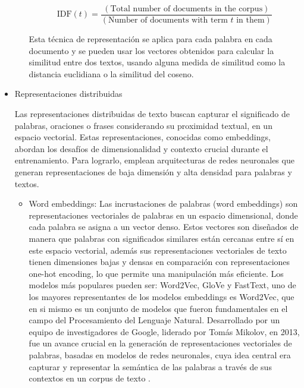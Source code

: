 \begin{itemize}
\begin{itemize}
\begin{equation} \label{eq:e24}
	\textrm{IDF}(t)=\frac{(\textrm{Total number of documents in the corpus})}{(\textrm{Number of documents with term } t \textrm{ in them})}
\end{equation}

Esta técnica de representación se aplica para cada palabra en cada documento y se  pueden usar los vectores obtenidos para calcular la similitud entre dos textos, usando alguna medida de similitud como la distancia euclidiana o la similitud del coseno.


\end{itemize}

\item Representaciones distribuidas

Las representaciones distribuidas de texto buscan capturar el significado de palabras, oraciones o frases considerando su proximidad textual, en un espacio vectorial. Estas representaciones, conocidas como embeddings, abordan los desafíos de dimensionalidad y contexto crucial durante el entrenamiento. Para lograrlo, emplean arquitecturas de redes neuronales que generan representaciones de baja dimensión y alta densidad para palabras y textos.

\begin{itemize}

	\item Word embeddings: Las incrustaciones de palabras (word embeddings) son representaciones vectoriales de palabras en un espacio dimensional, donde cada palabra se asigna a un vector denso. Estos vectores son diseñados de manera que palabras con significados similares están cercanas entre sí en este espacio vectorial, además sus representaciones vectoriales de texto tienen dimensiones bajas y densas en comparación con representaciones one-hot encoding, lo que permite una manipulación más eficiente. Los modelos  más populares pueden ser: Word2Vec, GloVe y FastText, uno de los mayores representantes de los modelos embeddings es Word2Vec, que en si mismo es un conjunto de modelos que fueron fundamentales en el campo del Procesamiento del Lenguaje Natural. Desarrollado por un equipo de investigadores de Google, liderado por Tomás Mikolov, en 2013, fue un avance crucial en la generación de representaciones vectoriales de palabras, basadas en modelos de redes neuronales, cuya idea central era capturar y representar la semántica de las palabras a través de sus contextos en un corpus de texto \cite{mikolov2013efficient}. 
	

\end{itemize}
\end{itemize}
